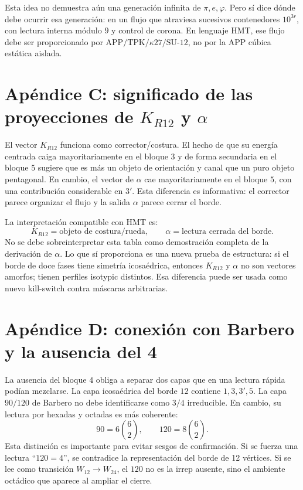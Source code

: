 \documentclass[11pt,a4paper]{article}
\newcommand{\APP}{\mathrm{APP}}
\newcommand{\TPK}{\mathrm{TPK}}
\newcommand{\SUtwelve}{\mathrm{SU}\text{-}12}
\begin{document}
Esta idea no demuestra aún una generación infinita de $\pi,e,\varphi$. Pero sí dice dónde debe ocurrir esa generación: en un flujo que atraviesa sucesivos contenedores $10^{3r}$, con lectura interna módulo $9$ y control de corona. En lenguaje HMT, ese flujo debe ser proporcionado por $\APP/\TPK/\kappa27/\SUtwelve$, no por la APP cúbica estática aislada.

\section{Apéndice C: significado de las proyecciones de $K_{R12}$ y $\alpha$}
El vector $K_{R12}$ funciona como corrector/costura. El hecho de que su energía centrada caiga mayoritariamente en el bloque $3$ y de forma secundaria en el bloque $5$ sugiere que es más un objeto de orientación y canal que un puro objeto pentagonal. En cambio, el vector de $\alpha$ cae mayoritariamente en el bloque $5$, con una contribución considerable en $3'$. Esta diferencia es informativa: el corrector parece organizar el flujo y la salida $\alpha$ parece cerrar el borde.

La interpretación compatible con HMT es:
\[
K_{R12}=\text{objeto de costura/rueda},\qquad \alpha=\text{lectura cerrada del borde}.
\]
No se debe sobreinterpretar esta tabla como demostración completa de la derivación de $\alpha$. Lo que sí proporciona es una nueva prueba de estructura: si el borde de doce fases tiene simetría icosaédrica, entonces $K_{R12}$ y $\alpha$ no son vectores amorfos; tienen perfiles isotypic distintos. Esa diferencia puede ser usada como nuevo kill-switch contra máscaras arbitrarias.

\section{Apéndice D: conexión con Barbero y la ausencia del 4}
La ausencia del bloque $4$ obliga a separar dos capas que en una lectura rápida podían mezclarse. La capa icosaédrica del borde $12$ contiene $1,3,3',5$. La capa $90/120$ de Barbero no debe identificarse como $3/4$ irreducible. En cambio, su lectura por hexadas y octadas es más coherente:
\[
90=6\binom62,
\qquad
120=8\binom62.
\]
Esta distinción es importante para evitar sesgos de confirmación. Si se fuerza una lectura ``$120=4$'', se contradice la representación del borde de 12 vértices. Si se lee como transición $W_{12}\to W_{24}$, el $120$ no es la irrep ausente, sino el ambiente octádico que aparece al ampliar el cierre.
\end{document}
